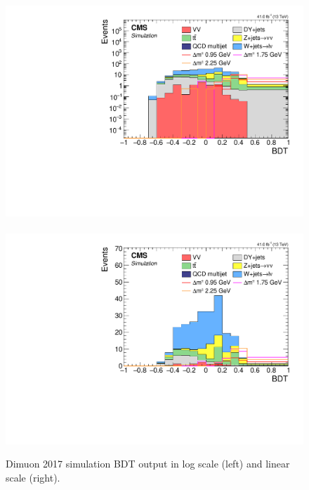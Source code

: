 \begin{figure}[!htb]
\centering
\includegraphics[width=0.48\linewidth]{plots/dilepton_muons_2017/none_custom_dilepBDTCorrJetNoMultIso10Dr0.6_log.pdf} \,
\includegraphics[width=0.48\linewidth]{plots/dilepton_muons_2017/none_custom_dilepBDTCorrJetNoMultIso10Dr0.6.pdf} \\


\caption[Dimuon simulation BDT output]{Dimuon 2017 simulation BDT output in log scale (left) and linear scale (right).}
\label{fig:dimuon-bdt-sim-output}
\end{figure}

